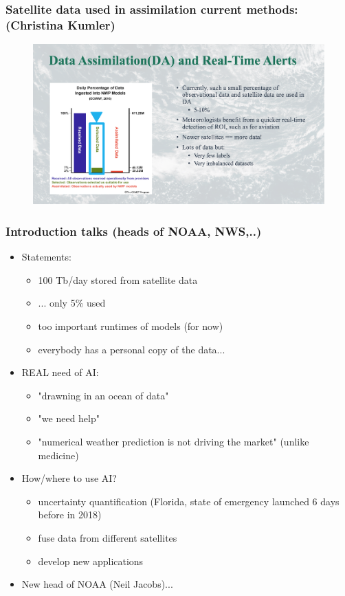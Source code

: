 \documentclass{beamer}
\begin{document}
\begin{frame}
\frametitle{Satellite data used in assimilation current methods: (Christina Kumler)}
\begin{figure}
	\includegraphics[width=\linewidth]{figs/Data_Assimilation.png}
\end{figure}
\end{frame}


\begin{frame}
\frametitle{Introduction talks (heads of NOAA, NWS,..)}

\begin{itemize}

\item Statements: 
	\begin{itemize}
		\item 100 Tb/day stored from satellite data
		\item ... only 5\% used
		\item too important runtimes of models (for now)
		\item everybody has a personal copy of the data...
	\end{itemize}
\item REAL need of AI:
	\begin{itemize}
		\item "drawning in an ocean of data"
		\item "we need help"
		\item "numerical weather prediction is not driving the market" (unlike medicine)
	\end{itemize}
\item How/where to use AI?
	\begin{itemize}
		\item uncertainty quantification (Florida, state of emergency launched 6 days before in 2018)
		\item fuse data from different satellites
		\item develop new applications
	\end{itemize}
\item New head of NOAA (Neil Jacobs)...
\end{itemize}
\end{frame}
\end{document}
